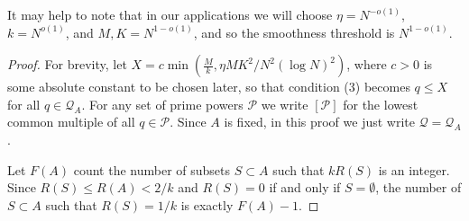 \documentclass{amsart}
\begin{document}
It may help to note that in our applications we will choose $\eta=N^{-o(1)}$, $k=N^{o(1)}$, and $M,K=N^{1-o(1)}$, and so the smoothness threshold is $N^{1-o(1)}$. 

\begin{proof}
For brevity, let $X= c\min(\frac{M}{k},\eta MK^2/N^2(\log N)^2)$, where $c>0$ is some absolute constant to be chosen later, so that condition (3) becomes $q\leq X$ for all $q\in\mathcal{Q}_A$. For any set of prime powers $\mathcal{P}$ we write $[\mathcal{P}]$ for the lowest common multiple of all $q\in\mathcal{P}$. Since $A$ is fixed, in this proof we just write $\mathcal{Q}=\mathcal{Q}_A$.

Let $F(A)$ count the number of subsets $S\subset A$ such that $kR(S)$ is an integer. Since $R(S)\leq R(A)<2/k$ and $R(S)=0$ if and only if $S=\emptyset$, the number of $S\subset A$ such that $R(S)=1/k$ is exactly $F(A)-1$.


\end{proof}
\end{document}
